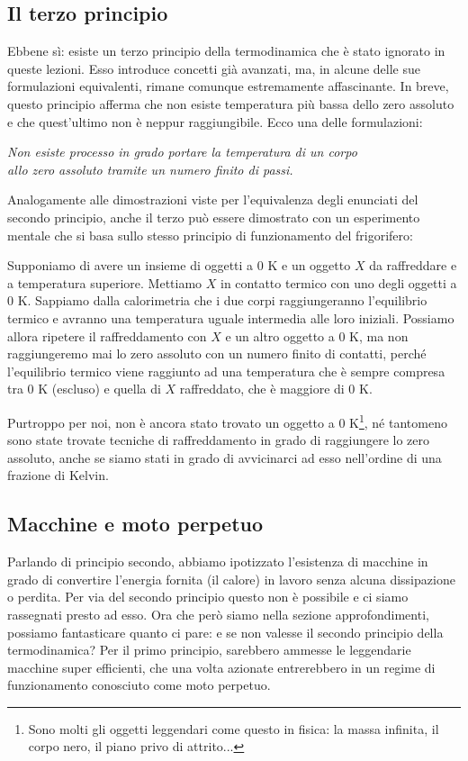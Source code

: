 \subsection{Il terzo principio}
Ebbene sì: esiste un terzo principio della termodinamica che è stato
ignorato in queste lezioni. Esso introduce concetti già avanzati, ma,
in alcune delle sue formulazioni equivalenti, rimane comunque estremamente
affascinante. In breve, questo principio afferma che non esiste
temperatura più bassa dello zero assoluto e che quest'ultimo non è
neppur raggiungibile. Ecco una delle formulazioni:

\begin{center}
    \textit{Non esiste processo in grado portare la temperatura di un corpo\\allo
    zero assoluto tramite un numero finito di passi.}
\end{center}

\noindent Analogamente alle dimostrazioni viste per l'equivalenza
degli enunciati del secondo principio, anche il terzo può essere
dimostrato con un esperimento mentale che si basa sullo stesso principio
di funzionamento del frigorifero:

Supponiamo di avere un insieme di oggetti a 0 K e un oggetto $X$ da
raffreddare e a temperatura superiore. Mettiamo $X$ in
contatto termico con uno degli oggetti a 0 K. Sappiamo dalla calorimetria
che i due corpi raggiungeranno l'equilibrio termico e avranno una
temperatura uguale intermedia alle loro iniziali. Possiamo allora
ripetere il raffreddamento con $X$ e un altro oggetto a 0 K, ma
non raggiungeremo mai lo zero assoluto con un numero finito di
contatti, perché l'equilibrio termico viene raggiunto ad una temperatura
che è sempre compresa tra 0 K (escluso) e quella di $X$ raffreddato, che
è maggiore di 0 K.

Purtroppo per noi, non è ancora stato trovato un oggetto a 0 K\footnote{Sono
molti gli oggetti leggendari come questo in fisica: la massa infinita, il
corpo nero, il piano privo di attrito...}, né tantomeno sono state
trovate tecniche di raffreddamento in grado di raggiungere lo zero
assoluto, anche se siamo stati in grado di avvicinarci ad esso
nell'ordine di una frazione di Kelvin.


\subsection{Macchine e moto perpetuo}
Parlando di principio secondo, abbiamo ipotizzato l'esistenza di macchine
in grado di convertire l'energia fornita (il calore) in lavoro senza alcuna
dissipazione o perdita. Per via del secondo principio questo non è possibile
e ci siamo rassegnati presto ad esso. Ora che però siamo nella sezione approfondimenti,
possiamo fantasticare quanto ci pare: e se non valesse il secondo principio
della termodinamica? Per il primo principio, sarebbero ammesse le leggendarie
macchine super efficienti, che una volta azionate entrerebbero in un regime
di funzionamento conosciuto come moto perpetuo.

